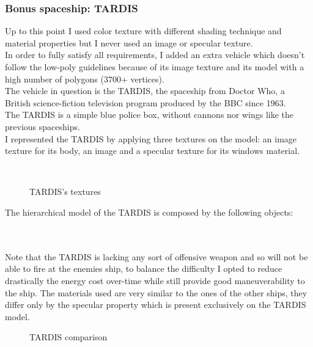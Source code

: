\documentclass[a4paper,11pt]{article}
\begin{document}
\subsubsection{Bonus spaceship: TARDIS}
Up to this point I used color texture with different shading technique and material properties but I never used an image or specular texture.\\
In order to fully satisfy all requirements, I added an extra vehicle which doesn't follow the low-poly guidelines because of its image texture and its model with a high number of polygons (3700+ vertices).\\
The vehicle in question is the TARDIS, the spaceship from Doctor Who, a British science-fiction television program produced by the BBC since 1963.\\
The TARDIS is a simple blue police box, without cannons nor wings like the previous spaceships.\\
I represented the TARDIS by applying three textures on the model: an image texture for its body, an image and a specular texture for its windows material.
\begin{figure}[H]%
    \centering
    \qquad\\
    \enskip
    
    \caption{TARDIS's textures}%
\end{figure}
The hierarchical model of the TARDIS is composed by the following objects:\\
\begin{minipage}{0.9\textwidth}
\end{minipage}\\
\\Note that the TARDIS is lacking any sort of offensive weapon and so will not be able to fire at the enemies ship, to balance the difficulty I opted to reduce drastically the energy cost over-time while still provide good maneuverability to the ship.
The materials used are very similar to the ones of the other ships, they differ only by the specular property which is present exclusively on the TARDIS model.
\begin{figure}[H]%
    \centering
    \qquad
    
    \qquad
    
    \caption{TARDIS comparison}%
\end{figure}
\end{document}
